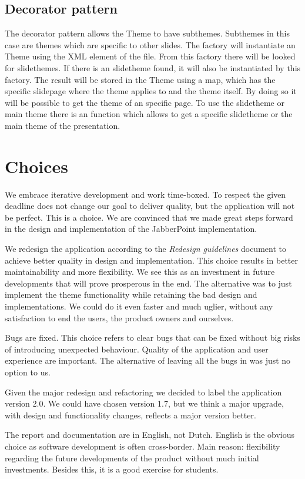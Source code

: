 \documentclass[a4paper]{article}
\begin{document}
\subsection{Decorator pattern}
The decorator pattern allows the Theme to have subthemes. Subthemes in this case are themes which are specific to other slides. The factory will instantiate an Theme using the XML element of the file. From this factory there will be looked for slidethemes. If there is an slidetheme found, it will also be instantiated by this factory. The result will be stored in the Theme using a map, which has the specific slidepage where the theme applies to and the theme itself. By doing so it will be possible to get the theme of an specific page. To use the slidetheme or main theme there is an function which allows to get a specific slidetheme or the main theme of the presentation.

\section{Choices}
We embrace iterative development and work time-boxed. To respect the given deadline does not change our goal to deliver quality, but the application will not be perfect. This is a choice. We are convinced that we made great steps forward in the design and implementation of the JabberPoint implementation.

We redesign the application according to the \textit{Redesign guidelines} document to achieve better quality in design and implementation. This choice results in better maintainability and more flexibility. We see this as an investment in future developments that will prove prosperous in the end. The alternative was to just implement the theme functionality while retaining the bad design and implementations. We could do it even faster and much uglier, without any satisfaction to end the users, the product owners and ourselves.

Bugs are fixed. This choice refers to clear bugs that can be fixed without big risks of introducing unexpected behaviour. Quality of the application and user experience are important. The alternative of leaving all the bugs in was just no option to us.

Given the major redesign and refactoring we decided to label the application version 2.0. We could have chosen version 1.7, but we think a major upgrade, with design and functionality changes, reflects a major version better. 

The report and documentation are in English, not Dutch. English is the obvious choice as software development is often cross-border. Main reason: flexibility regarding the future developments of the product without much initial investments. Besides this, it is a good exercise for students.
\end{document}
